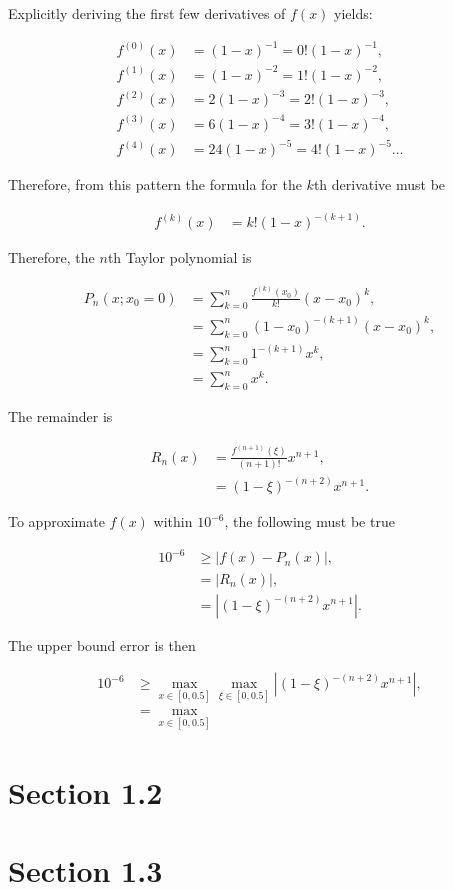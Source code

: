 \documentclass[a4paper, 10pt]{article}
\newenvironment{answer}[1][Answer]{\begin{trivlist}
\item[\hskip\labelsep{\textit{#1.}}]}{\end{trivlist}}
\begin{document}
\begin{answer}
	Explicitly deriving the first few derivatives of $f(x)$ yields:

	\begin{align*}
		f^{(0)}(x) &= (1-x)^{-1} = 0! (1-x)^{-1},\\
		f^{(1)}(x) &= (1-x)^{-2} = 1! (1-x)^{-2},\\
		f^{(2)}(x) &= 2(1-x)^{-3} = 2! (1-x)^{-3},\\
		f^{(3)}(x) &= 6(1-x)^{-4} = 3! (1-x)^{-4},\\
		f^{(4)}(x) &= 24(1-x)^{-5} = 4! (1-x)^{-5}\ldots
	\end{align*}

	Therefore, from this pattern the formula for the $k$th derivative must be 

	\begin{align*}
		f^{(k)}(x) &= k! (1-x)^{-(k+1)}.
	\end{align*}

	Therefore, the $n$th Taylor polynomial is

	\begin{align*}
		P_n(x; x_0 = 0) &= \sum_{k=0}^n \frac{f^{(k)}(x_0)}{k!} (x - x_0)^k,\\
		&= \sum_{k=0}^n (1-x_0)^{-(k+1)} (x - x_0)^k,\\
		&= \sum_{k=0}^n 1^{-(k+1)} x^k,\\
		&= \sum_{k=0}^n x^k.
	\end{align*}

	The remainder is

	\begin{align*}
		R_n (x) &= \frac{f^{(n+1)}(\xi)}{(n+1)!} x^{n+1},\\
				&= (1-\xi)^{-(n+2)} x^{n+1}.
	\end{align*}

	To approximate $f(x)$ within $10^{-6}$, the following must be true

	\begin{align*}
		10^{-6} &\geq \left| f(x) - P_n (x) \right|,\\
				&= \left| R_n (x) \right|,\\
				&= \left| (1-\xi)^{-(n+2)} x^{n+1} \right|.
	\end{align*}

	The upper bound error is then

	\begin{align*}
		10^{-6} &\geq \max_{x\in [0,0.5]} \max_{\xi\in [0,0.5]} \left| (1-\xi)^{-(n+2)} x^{n+1} \right|,\\
				&= \max_{x\in [0,0.5]}
	\end{align*}
\end{answer}

\section{Section 1.2}


\section{Section 1.3}

\end{document}
